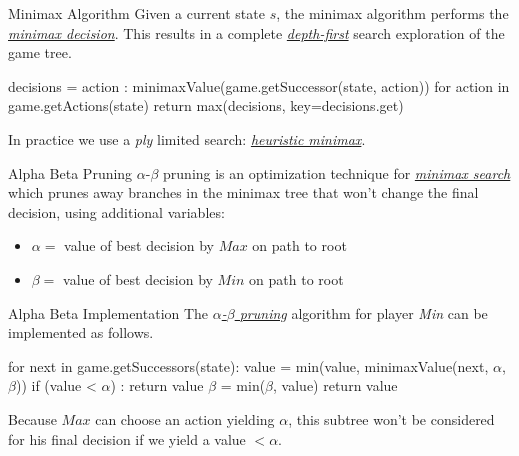 \documentclass{cognito}
\begin{document}
\begin{note}{Minimax Algorithm}
	Given a current state $s$, the minimax algorithm performs the \hyperref[note:Minimax Decision]{\emph{minimax decision}}.
	This results in a complete \hyperref[note:Depth-First Search]{\emph{depth-first}} search exploration of the game tree.
		\begin{code}
decisions = { 
	action : minimaxValue(game.getSuccessor(state, action))
	for action in game.getActions(state)
}
return max(decisions, key=decisions.get)
	\end{code}
	\begin{remark}
		In practice we use a \emph{ply} limited search: \hyperref[note:Heuristic Minimax]{\it heuristic minimax}.
	\end{remark}
	\vspace{-5pt}
\end{note}

\begin{note}{Alpha Beta Pruning}
	$\alpha$-$\beta$ pruning is an optimization technique for \hyperref[note:Minimax Algorithm]{\it minimax search}
	which prunes away branches in the minimax tree that won't change the final decision, using additional variables:
	\begin{itemize}
		\item $\alpha =$ value of best decision by $Max$ on path to root
		\item $\beta =$ value of best decision by $Min$ on path to root
	\end{itemize}
\end{note}

\begin{note}{Alpha Beta Implementation}
	The \hyperref[note:Alpha Beta Pruning]{\it $\alpha$-$\beta$ pruning} algorithm  for player \textit{Min} can be implemented as follows.
	\begin{code}
for next in game.getSuccessors(state):
	value = min(value, minimaxValue(next, $\alpha$, $\beta$))
	if (value < $\alpha$) : return value
	$\beta$ = min($\beta$, value)
return value
	\end{code}
	Because $Max$ can choose an action yielding $\alpha$, this subtree won't be considered for his
	final decision if we yield a value $< \alpha$.
	
\end{note}
\end{document}
